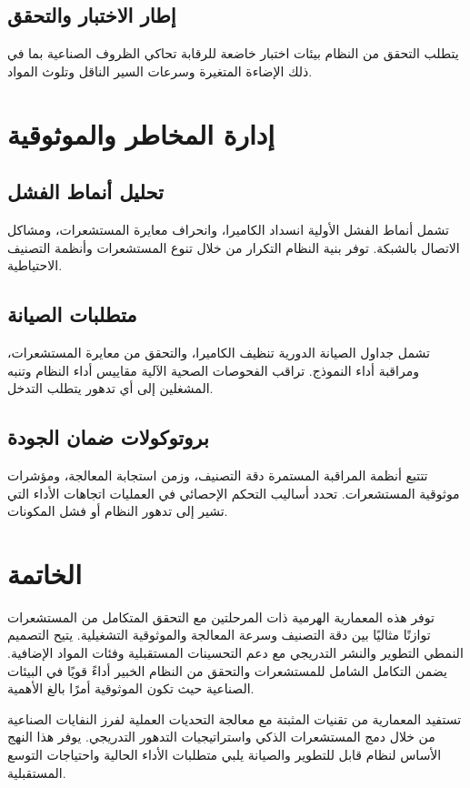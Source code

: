 \documentclass[11pt, a4paper]{article}
\begin{document}
\begin{RTL}
\subsection{إطار الاختبار والتحقق}
يتطلب التحقق من النظام بيئات اختبار خاضعة للرقابة تحاكي الظروف الصناعية بما في ذلك الإضاءة المتغيرة وسرعات السير الناقل وتلوث المواد.

\section{إدارة المخاطر والموثوقية}
\subsection{تحليل أنماط الفشل}
تشمل أنماط الفشل الأولية انسداد الكاميرا، وانحراف معايرة المستشعرات، ومشاكل الاتصال بالشبكة. توفر بنية النظام التكرار من خلال تنوع المستشعرات وأنظمة التصنيف الاحتياطية.

\subsection{متطلبات الصيانة}
تشمل جداول الصيانة الدورية تنظيف الكاميرا، والتحقق من معايرة المستشعرات، ومراقبة أداء النموذج. تراقب الفحوصات الصحية الآلية مقاييس أداء النظام وتنبه المشغلين إلى أي تدهور يتطلب التدخل.

\subsection{بروتوكولات ضمان الجودة}
تتتبع أنظمة المراقبة المستمرة دقة التصنيف، وزمن استجابة المعالجة، ومؤشرات موثوقية المستشعرات. تحدد أساليب التحكم الإحصائي في العمليات اتجاهات الأداء التي تشير إلى تدهور النظام أو فشل المكونات.

\section{الخاتمة}
توفر هذه المعمارية الهرمية ذات المرحلتين مع التحقق المتكامل من المستشعرات توازنًا مثاليًا بين دقة التصنيف وسرعة المعالجة والموثوقية التشغيلية. يتيح التصميم النمطي التطوير والنشر التدريجي مع دعم التحسينات المستقبلية وفئات المواد الإضافية. يضمن التكامل الشامل للمستشعرات والتحقق من النظام الخبير أداءً قويًا في البيئات الصناعية حيث تكون الموثوقية أمرًا بالغ الأهمية.

تستفيد المعمارية من تقنيات  المثبتة مع معالجة التحديات العملية لفرز النفايات الصناعية من خلال دمج المستشعرات الذكي واستراتيجيات التدهور التدريجي. يوفر هذا النهج الأساس لنظام قابل للتطوير والصيانة يلبي متطلبات الأداء الحالية واحتياجات التوسع المستقبلية.

\end{RTL} %
\end{document}
